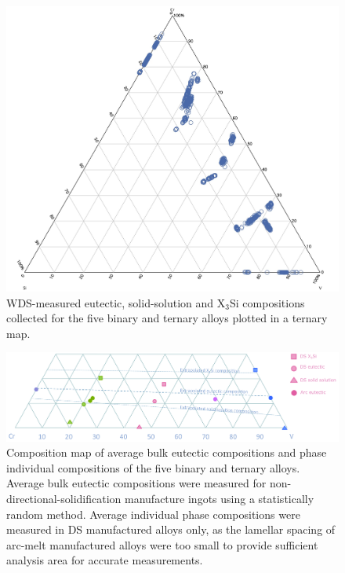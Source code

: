 %
\begin{figure}[H]
\includegraphics[width=16cm]{ternarymap}
\caption{ WDS-measured eutectic, solid-solution and X$_3$Si compositions collected for the five binary and ternary alloys plotted in a ternary map.}
\label{fig:ternarymap}
\end{figure}
%
%
\begin{landscape}\vspace*{\fill}
\begin{figure}[H]
\begin{center}
\includegraphics[width=24cm]{WDSaveragecompo}
\caption{Composition map of average bulk eutectic compositions and phase individual compositions of the five binary and ternary alloys.  Average bulk eutectic compositions were measured for non-directional-solidification manufacture ingots using a statistically random method.  Average individual phase compositions were measured in DS manufactured alloys only, as the lamellar spacing of arc-melt manufactured alloys were too small to provide sufficient analysis area for accurate measurements.}
\label{fig:WDSaveragecompo}
\end{center}
\end{figure}
\end{landscape}
%


